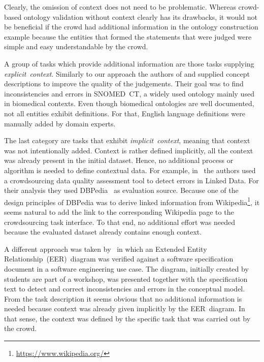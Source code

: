 Clearly, the omission of context does not need to be problematic. Whereas crowd-based ontology validation without context clearly has its drawbacks, it would not be beneficial if the crowd had additional information in the ontology construction example because the entities that formed the statements that were judged were simple and easy understandable by the crowd. 

A group of tasks which provide additional information are those tasks supplying \emph{explicit~context}. Similarly to our approach the authors of \cite{mortensen2015} and \cite{mortensen2016} supplied concept descriptions to improve the quality of the judgements. Their goal was to find inconsistencies and errors in SNOMED~CT, a widely used ontology mainly used in biomedical contexts. Even though biomedical ontologies are well documented, not all entities exhibit definitions. For that, English language definitions were manually added by domain experts. 

The last category are tasks that exhibit \emph{implicit~context}, meaning that context was not intentionally added. Context is rather defined implicitly, all the context was already present in the initial dataset. Hence, no additional process or algorithm is needed to define contextual data. For example, in~\cite{acosta2018} the authors used a crowdsourcing data quality assessment tool to detect errors in Linked Data. 
For their analysis they used DBPedia~\cite{auer2007} as evaluation source. Because one of the design principles of DBPedia was to derive linked information from Wikipedia\footnote{\url{https://www.wikipedia.org/}}, it seems natural to add the link to the corresponding Wikipedia page to the crowdsourcing task interface. To that end, no additional effort was needed because the evaluated dataset already contains enough context.

A different approach was taken by~\cite{sabou2018, winkler2017, winkler2017_2} in which an Extended Entity Relationship~(EER)~diagram was verified against a software specification document in a software engineering use case. The diagram, initially created by students are part of a workshop, was presented together with the specification text to detect and correct inconsistencies and errors in the conceptual model. From the task description it seems obvious that no additional information is needed because context was already given implicitly by the EER~diagram. In that sense, the context was defined by the specific task that was carried out by the crowd. 

